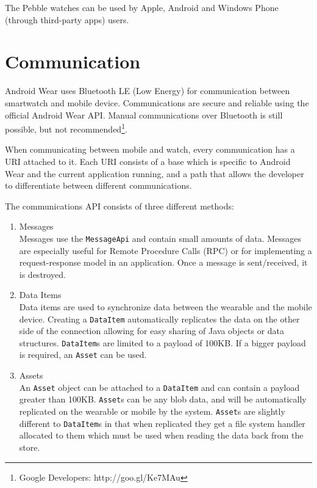 The Pebble watches can be used by Apple, Android and Windows Phone (through
third-party apps) users.

\section{Communication}
Android Wear uses Bluetooth LE (Low Energy) for communication between
smartwatch and mobile device. Communications are secure and reliable using the
official Android Wear API. Manual communications over Bluetooth is still
possible, but not recommended\footnote{Google Developers: http://goo.gl/Ke7MAu}.

When communicating between mobile and watch, every communication has a URI
attached to it. Each URI consists of a base which is specific to Android Wear
and the current application running, and a path that allows the developer to
differentiate between different communications.

The communications API consists of three different methods:
\begin{enumerate}

\item Messages\\
Messages use the \texttt{MessageApi} and contain small amounts of data. Messages
are especially useful for Remote Procedure Calls (RPC) or for implementing a
request-response model in an application. Once a message is sent/received, it
is destroyed.
\item Data Items\\
Data items are used to synchronize data between the wearable and the mobile
device. Creating a \texttt{DataItem} automatically replicates the data on the
other side of the connection allowing for easy sharing of Java objects or data
structures. \texttt{DataItem}s are limited to a payload of 100KB. If a bigger
payload is required, an \texttt{Asset} can be used.
\item Assets\\
An \texttt{Asset} object can be attached to a \texttt{DataItem} and can contain
a payload greater than 100KB. \texttt{Asset}s can be any blob data, and will be
automatically replicated on the wearable or mobile by the system.
\texttt{Asset}s are slightly different to \texttt{DataItem}s in that when
replicated they get a file system handler allocated to them which must be used
when reading the data back from the store.

\end{enumerate}

